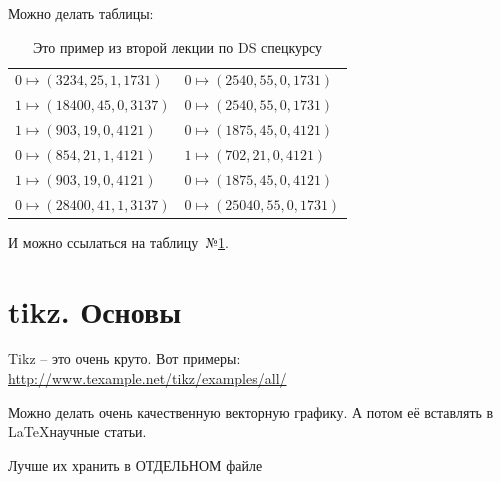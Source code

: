 \documentclass{beamer}
\newcommand{\рис}[1]{рис.\ref{#1}}
\newcommand{\Рис}[1]{Рис.\ref{#1}}
\newcommand{\таблицa}[1]{таблица~№\ref{#1}} %
\newcommand{\таблицы}[1]{таблицы~№\ref{#1}} %
\newcommand{\таблице}[1]{таблице~№\ref{#1}} %
\newcommand{\таблицу}[1]{таблицу~№\ref{#1}} %
\newcommand{\таблицей}[1]{таблицей~№\ref{#1}} %
\newcommand{\Таблицa}[1]{Таблица~№\ref{#1}} %
\newcommand{\Таблицы}[1]{Таблицы~№\ref{#1}} %
\newcommand{\Таблице}[1]{Таблице~№\ref{#1}} %
\newcommand{\Таблицу}[1]{Таблицу~№\ref{#1}} %
\newcommand{\Таблицей}[1]{Таблицей~№\ref{#1}} %
\begin{document}
\begin{frame}
	Можно делать таблицы:

	\begin{center}
	\small 
		\begin{table}
		\begin{tabular}{ l l }
			$0 \mapsto (3234, 25, 1, 1731) $ &  $0 \mapsto (2540, 55, 0, 1731)$ \\
			$1 \mapsto (18400, 45, 0, 3137)$ & $0 \mapsto (2540, 55, 0, 1731)$  \\
			$1 \mapsto (903, 19, 0, 4121)$  & $0 \mapsto (1875, 45, 0, 4121)$  \\
			$0 \mapsto (854, 21, 1, 4121)$  & $1 \mapsto (702, 21, 0, 4121)$  \\
			$1 \mapsto (903, 19, 0, 4121)$  & $0 \mapsto (1875, 45, 0, 4121)$  \\
			$0 \mapsto (28400, 41, 1, 3137)$ & $0 \mapsto (25040, 55, 0, 1731)$  \\
		\end{tabular}
		\caption{Это пример из второй лекции по DS спецкурсу}
		\label{table:example}
		\end{table}
	\end{center}
	И можно ссылаться на \таблицу{table:example}.
\end{frame}

 
\section{tikz. Основы}

\begin{frame}
Tikz -- это очень круто. Вот примеры: \url{http://www.texample.net/tikz/examples/all/}

Можно делать очень качественную векторную графику. 
А потом её вставлять в \LaTeX научные статьи.

Лучше их хранить в ОТДЕЛЬНОМ файле

\end{frame}


	


  
\end{document}
